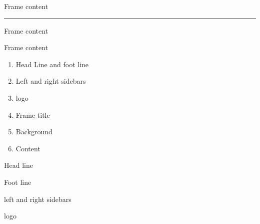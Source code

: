 \documentclass[9pt,blue,xcolor=pdftex,dvipsnames,table,handout,notes]{beamer}
\begin{document}

		\begin{frame}[t,squeeze]{Frame content}

\noindent
\rule{\textwidth}{5pt}


			Frame content


\vspace*{-0.4cm}
\hspace*{-1cm}
			\begin{block} {Frame content}

			\begin{enumerate}
			\item Head Line and foot line
			\item Left and right sidebars
			\item logo
			\item Frame title
			\item Background
			\item Content
			\end{enumerate}
			\end{block}



\vspace*{-\baselineskip}
			\begin{block} {Head line}
			\end{block}


\vspace*{-\baselineskip}
			\begin{block} {Foot line}
			\end{block}


\vspace*{-\baselineskip}
			\begin{block} {left and right sidebars}
			\end{block}

			\begin{block} {logo}
			\end{block}



\end{frame}
\end{document}
